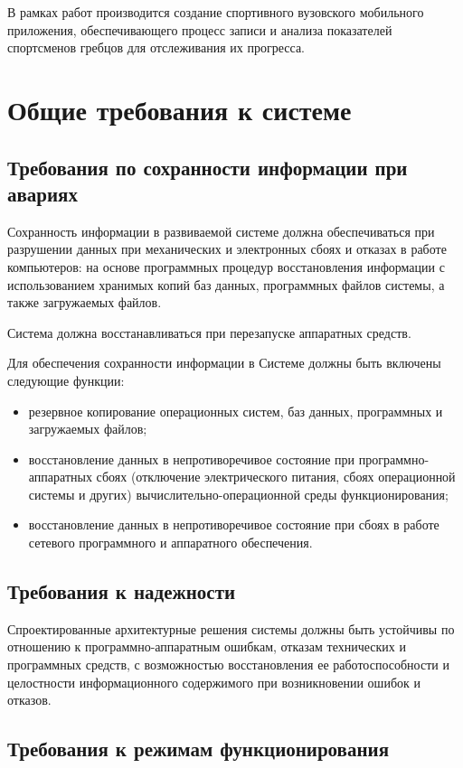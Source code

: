 \documentclass[14pt]{extreport}
\begin{document}
В рамках работ производится создание спортивного вузовского мобильного приложения, обеспечивающего процесс записи и анализа показателей спортсменов гребцов для отслеживания их прогресса.

\section{Общие требования к системе}

\subsection{Требования по сохранности информации при авариях}

Сохранность информации в развиваемой системе должна обеспечиваться при разрушении данных при механических и электронных сбоях и
отказах в работе компьютеров: на основе программных процедур
восстановления информации с использованием хранимых копий баз данных,
программных файлов системы, а также загружаемых файлов.

Система должна восстанавливаться при перезапуске аппаратных средств.

Для обеспечения сохранности информации в Системе должны быть
включены следующие функции:
\begin{itemize}
\item резервное копирование операционных систем, баз данных,
программных и загружаемых файлов;
\item восстановление данных в непротиворечивое состояние при
программно-аппаратных сбоях (отключение электрического питания, сбоях
операционной системы и других) вычислительно-операционной среды
функционирования;
\item	восстановление данных в непротиворечивое состояние при сбоях в
работе сетевого программного и аппаратного обеспечения.
\end{itemize}

\subsection{Требования к надежности}

Спроектированные архитектурные решения системы должны быть
устойчивы по отношению к программно-аппаратным ошибкам, отказам
технических и программных средств, с возможностью восстановления ее
работоспособности и целостности информационного содержимого при
возникновении ошибок и отказов.

\subsection{Требования к режимам функционирования}
\end{document}
